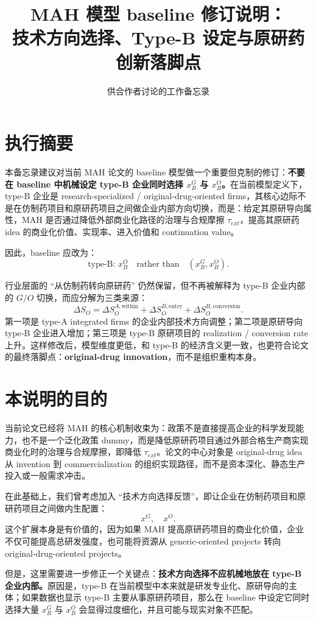 \documentclass[12pt]{article}
\title{MAH 模型 baseline 修订说明：\\技术方向选择、Type-B 设定与原研药创新落脚点}
\author{}
\date{供合作者讨论的工作备忘录}
\begin{document}
\maketitle

\section*{执行摘要}

本备忘录建议对当前 MAH 论文的 baseline 模型做一个重要但克制的修订：\textbf{不要在 baseline 中机械设定 type-B 企业同时选择 $x_B^G$ 与 $x_B^O$。}在当前模型定义下，type-B 企业是 research-specialized / original-drug-oriented firms，其核心边际不是在仿制药项目和原研药项目之间做企业内部方向切换，而是：给定其原研导向属性，MAH 是否通过降低外部商业化路径的治理与合规摩擦 $\tau_{ext}$，提高其原研药 idea 的商业化价值、实现率、进入价值和 continuation value。

因此，baseline 应改为：
\[
\text{type-B: } x_B^O \quad \text{rather than} \quad (x_B^G,x_B^O).
\]

行业层面的 ``从仿制药转向原研药'' 仍然保留，但不再被解释为 type-B 企业内部的 $G/O$ 切换，而应分解为三类来源：
\[
\Delta S_O
=
\Delta S_O^{A,\mathrm{within}}
+
\Delta S_O^{B,\mathrm{entry}}
+
\Delta S_O^{B,\mathrm{conversion}}.
\]
第一项是 type-A integrated firms 的企业内部技术方向调整；第二项是原研导向 type-B 企业进入增加；第三项是 type-B 原研项目的 realization / conversion rate 上升。这样修改后，模型维度更低，和 type-B 的经济含义更一致，也更符合论文的最终落脚点：\textbf{original-drug innovation}，而不是组织重构本身。

\section{本说明的目的}

当前论文已经将 MAH 的核心机制收束为：政策不是直接提高企业的科学发现能力，也不是一个泛化政策 dummy，而是降低原研药项目通过外部合格生产商实现商业化时的治理与合规摩擦，即降低 $\tau_{ext}$。论文的中心对象是 original-drug idea 从 invention 到 commercialization 的组织实现路径，而不是资本深化、静态生产投入或一般需求冲击。

在此基础上，我们曾考虑加入 ``技术方向选择反馈''，即让企业在仿制药项目和原研药项目之间做内生配置：
\[
x^G,\quad x^O.
\]
这个扩展本身是有价值的，因为如果 MAH 提高原研药项目的商业化价值，企业不仅可能提高总研发强度，也可能将资源从 generic-oriented projects 转向 original-drug-oriented projects。

但是，这里需要进一步修正一个关键点：\textbf{技术方向选择不应机械地放在 type-B 企业内部。}原因是，type-B 在当前模型中本来就是研发专业化、原研导向的主体；如果数据也显示 type-B 主要从事原研药项目，那么在 baseline 中设定它同时选择大量 $x_B^G$ 与 $x_B^O$ 会显得过度细化，并且可能与现实对象不匹配。
\end{document}
